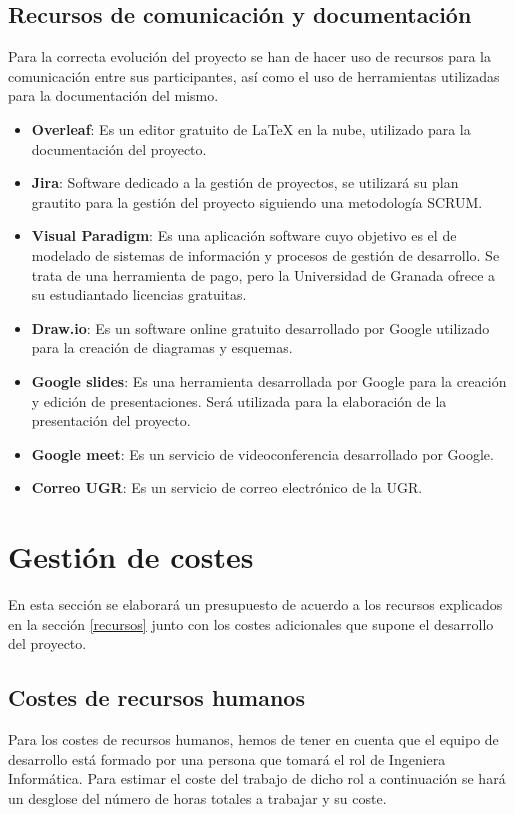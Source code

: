 \subsection{Recursos  de comunicación y documentación}
Para la correcta evolución del proyecto se han de hacer uso de recursos para la comunicación entre sus participantes, así como el uso de herramientas utilizadas para la documentación del mismo.

\begin{itemize}
    \item \textbf{Overleaf}: Es un editor gratuito de LaTeX en la nube, utilizado para la documentación del proyecto.
    \item \textbf{Jira}: Software dedicado a la gestión de proyectos, se utilizará su plan grautito para la gestión del proyecto siguiendo una metodología SCRUM.
    \item \textbf{Visual Paradigm}: Es una aplicación software cuyo objetivo es el de modelado de sistemas de información y procesos de gestión de desarrollo. Se trata de una herramienta de pago, pero la Universidad de Granada ofrece a su estudiantado licencias gratuitas.
    \item \textbf{Draw.io}: Es un software online gratuito desarrollado por Google utilizado para la creación de diagramas y esquemas.
    \item \textbf{Google slides}: Es una herramienta desarrollada por Google para la creación y edición de presentaciones. Será utilizada para la elaboración de la presentación del proyecto.
    \item \textbf{Google meet}: Es un servicio de videoconferencia desarrollado por Google.
    \item \textbf{Correo UGR}: Es un servicio de correo electrónico de la UGR.
\end{itemize}

\section{Gestión de costes}
En esta sección se elaborará un presupuesto de acuerdo a los recursos explicados en la sección \ref{recursos} junto con los costes adicionales que supone el desarrollo del proyecto.

\subsection{Costes de recursos humanos}
Para los costes de recursos humanos, hemos de tener en cuenta que el equipo de desarrollo está formado por una persona que tomará el rol de Ingeniera Informática. Para estimar el coste del trabajo de dicho rol a continuación se hará un desglose del número de horas totales a trabajar y su coste. \bigskip

